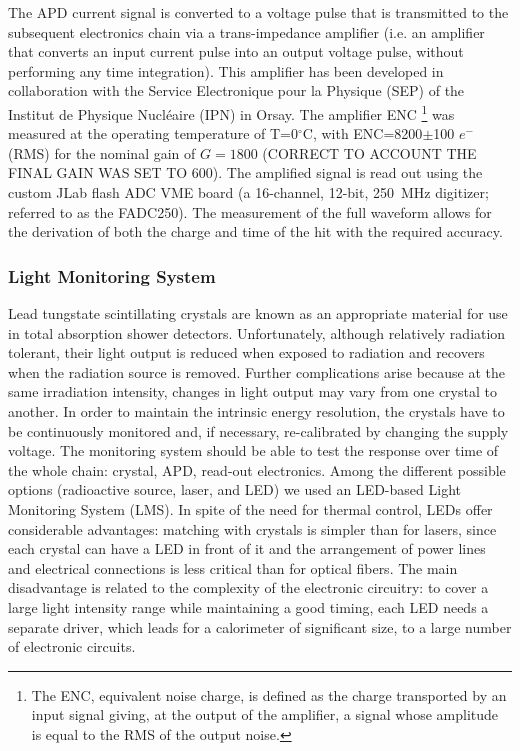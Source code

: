 The APD current signal is converted to a voltage pulse that is transmitted to the subsequent electronics chain via a
trans-impedance amplifier (i.e. an amplifier that converts an input current pulse into an output voltage pulse, without
performing any time integration). This amplifier has been developed in collaboration with the Service Electronique
pour la Physique (SEP) of the Institut de Physique Nucl{\'e}aire (IPN) in Orsay. The amplifier ENC \footnote{The ENC,
  equivalent noise charge, is defined as the charge transported by an input signal giving, at the output of the amplifier,
  a signal whose amplitude is equal to the RMS of the output noise.} was measured at the operating temperature of
T=0$^\circ$C,  with ENC=8200$\pm$100 $e^-$ (RMS) for the nominal gain of $G=1800$ {\color{red} (CORRECT
  TO ACCOUNT THE FINAL GAIN WAS SET TO 600)}. The amplified signal is read out using the custom JLab flash
ADC VME board (a 16-channel, 12-bit, 250~MHz digitizer; referred to as the FADC250). The measurement
of the full waveform allows for the derivation of both the charge and time of the hit with the required  accuracy.

\subsubsection{Light Monitoring System}

Lead tungstate scintillating crystals are known as an appropriate material for use in total absorption shower
detectors. Unfortunately, although relatively radiation tolerant, their light output is reduced when exposed to 
radiation and recovers when the radiation source is removed. Further complications arise because at the same
irradiation intensity, changes in light output may vary from one crystal to another. In order to maintain the intrinsic
energy resolution, the crystals have to be continuously monitored and, if necessary, re-calibrated by changing the
supply voltage. The monitoring system should be able to test the response over time of the whole chain: crystal,
APD, read-out electronics. Among the different possible options (radioactive source, laser, and LED) we used an
LED-based Light Monitoring System (LMS). In spite of the need for thermal control, LEDs offer considerable
advantages: matching with crystals is simpler than for lasers, since each crystal can have a LED in front of it and
the arrangement of power lines and electrical connections is less critical than for optical fibers. The main
disadvantage is related to the complexity of the electronic circuitry: to cover a large light intensity range while
maintaining a good timing, each LED needs a separate driver, which leads for a calorimeter of significant size, to
a large number of electronic circuits.

